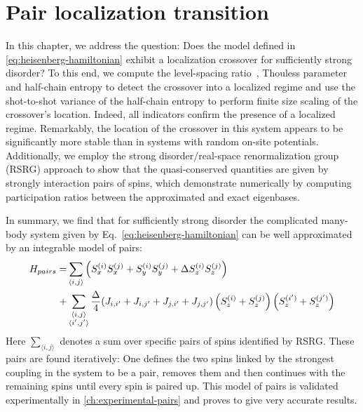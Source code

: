 \chapter{Pair localization transition}\label{ch:pair-localization-transition}

In this chapter, we address the question: Does the model defined in \autoref{eq:heisenberg-hamiltonian} exhibit a localization crossover for sufficiently strong disorder? To this end, we compute the level-spacing ratio~\cite{palManybodyLocalizationPhase2010}, Thouless parameter~\cite{serbynCriterionManybodyLocalizationdelocalization2015} and half-chain entropy to detect the crossover into a localized regime and use the shot-to-shot variance of the half-chain entropy to perform finite size scaling of the crossover's location. Indeed, all indicators confirm the presence of a localized regime. Remarkably, the location of the crossover in this system appears to be significantly more stable than in systems with random on-site potentials. Additionally, we employ the strong disorder/real-space renormalization group (RSRG) approach to show that the quasi-conserved quantities are given by strongly interaction pairs of spins, which demonstrate numerically by computing participation ratios between the approximated and exact eigenbases.

In summary, we find that for sufficiently strong disorder the complicated many-body system given by Eq.~\ref{eq:heisenberg-hamiltonian} can be well approximated by an integrable model of pairs:
\begin{align}\label{eq:pair-model}
	H_{pairs} =& \sum_{\langle i,j\rangle} \left(S_x^{(i)}S_x^{(j)} + S_y^{(i)}S_y^{(j)} + \Delta S_z^{(i)}S_z^{(j)}\right) \notag\\
	+ &\sum_{\substack{\langle i,j\rangle\\\langle i',j'\rangle}} \frac{\Delta}{4}(J_{i,i'}+J_{i,j'}+J_{j,i'}+J_{j,j'})\left(S_z^{(i)}+S_z^{(j)}\right)\left(S_z^{(i')}+S_z^{(j')}\right)
\end{align}
Here $\sum_{\langle i,j\rangle}$ denotes a sum over specific pairs of spins identified by RSRG. These pairs are found iteratively: One defines the two spins linked by the strongest coupling in the system to be a pair, removes them and then continues with the remaining spins until every spin is paired up. This model of pairs is validated experimentally in \autoref{ch:experimental-pairs} and proves to give very accurate results.

\newpage
{}


